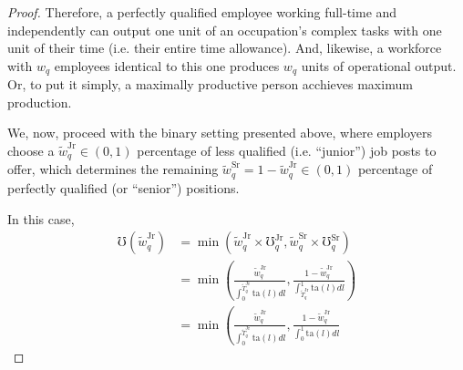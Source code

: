 \documentclass[hidelinks, nonatbib]{elsarticle}
\begin{document}
\begin{lemma}
\begin{proof}
        Therefore, a perfectly qualified employee working full-time and independently can output one unit of an occupation's complex tasks with one unit of their time (i.e. their entire time allowance). And, likewise, a workforce with $w_q$ employees identical to this one produces $w_q$ units of operational output. Or, to put it simply, a maximally productive person acchieves maximum production.
        
        We, now, proceed with the binary setting presented above, where employers choose a $\tilde{w}_{q}^{\text{Jr}} \in (0,1)$ percentage of less qualified (i.e. ``junior'') job posts to offer, which determines the remaining $\tilde{w}_{q}^{\text{Sr}} = 1 - \tilde{w}_{q}^{\text{Jr}} \in (0,1)$ percentage of perfectly qualified (or ``senior'') positions.
        
        In this case,
        \begin{align}
            \mho(\tilde{w}_{q}^{\text{Jr}})
            &=
            \min\left(
                \tilde{w}_{q}^{\text{Jr}}
                \times
                \mho_{q}^{\text{Jr}}
                ,
                \tilde{w}_{q}^{\text{Sr}}
                \times
                \mho_{q}^{\text{Sr}}
            \right)
            \\
            &=
            \min\left(
                \frac{
                    \tilde{w}_{q}^{\text{Jr}}
                }{
                    \int_{0}^{
                        \tilde{T}_{q}^{\text{Jr}}
                    }{
                        \text{ta}(l)
                        dl
                    }
                }
                ,
                \frac{
                    1 - \tilde{w}_{q}^{\text{Jr}}
                }{
                    \int_{
                        \tilde{T}_{q}^{\text{Jr}}
                    }^{1}{
                        \text{ta}(l)
                        dl
                    }
                }
            \right)
            \\
            &=
            \min\left(
                \frac{
                    \tilde{w}_{q}^{\text{Jr}}
                }{
                    \int_{0}^{
                        \tilde{T}_{q}^{\text{Jr}}
                    }{
                        \text{ta}(l)
                        dl
                    }
                }
                ,
                \frac{
                    1 - \tilde{w}_{q}^{\text{Jr}}
                }{
                    \int_{0}^{1}{
                        \text{ta}(l)
                        dl
                    }
}
\end{align}
\end{proof}
\end{lemma}
\end{document}
